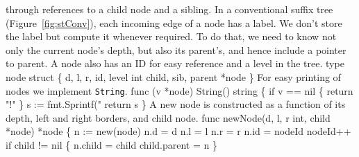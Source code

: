 through references to a child node and a sibling. In a conventional
suffix tree (Figure~\ref{fig:stConv}), each incoming edge of a node
has a label. We don't store the label but compute it whenever
required. To do that, we need to know not only the current node's
depth, but also its parent's, and hence include a pointer to parent. A
node also has an ID for easy reference and a level in the tree.
\nwenddocs{}\endmoddef\nwstartdeflinemarkup{}\nwenddeflinemarkup
type node struct \{
          d, l, r, id, level int
          child, sib, parent *node
\}
\nwendcode{}\nwdocspar
For easy printing of nodes we implement \texttt{String}.
\nwenddocs{}\endmoddef\nwstartdeflinemarkup{}\nwenddeflinemarkup
func (v *node) String() string \{
          if v == nil \{
                  return "!"
          \}
          s := fmt.Sprintf("%
          return s
\}
\nwendcode{}\nwdocspar
A new node is constructed as a function of its depth, left and right
borders, and child node.
\nwenddocs{}\plusendmoddef\nwstartdeflinemarkup{}\nwenddeflinemarkup
func newNode(d, l, r int, child *node) *node \{
          n := new(node)
          n.d = d
          n.l = l
          n.r = r
          n.id = nodeId
          nodeId++
          if child != nil \{
                  n.child = child
                  child.parent = n
          \}

